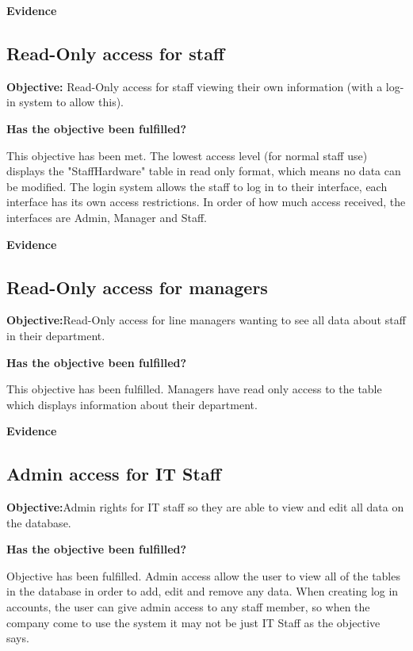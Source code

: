 \textbf{Evidence}


\subsection{Read-Only access for staff}

\textbf{Objective:} Read-Only access for staff viewing their own information (with a log-in system to allow this).

\textbf{Has the objective been fulfilled?}

This objective has been met. The lowest access level (for normal staff use) displays the "StaffHardware" table in read only format, which means no data can be modified. The login system allows the staff to log in to their interface, each interface has its own access restrictions. In order of how much access received, the interfaces are Admin, Manager and Staff.

\textbf{Evidence}



\subsection{Read-Only access for managers}

\textbf{Objective:}Read-Only access for line managers wanting to see all data about staff in their department.

\textbf{Has the objective been fulfilled?}

This objective has been fulfilled. Managers have read only access to the table which displays information about their department.

\textbf{Evidence}



\subsection{Admin access for IT Staff}

\textbf{Objective:}Admin rights for IT staff so they are able to view and edit all data on the database.

\textbf{Has the objective been fulfilled?}

Objective has been fulfilled. Admin access allow the user to  view all of the tables in the database in order to add, edit and remove any data. When creating log in accounts, the user can give admin access to any staff member, so when the company come to use the system it may not be just IT Staff as the objective says.

